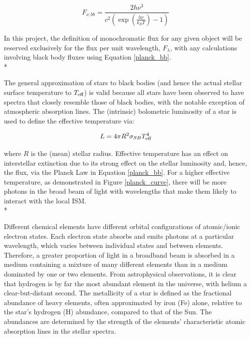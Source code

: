 \documentclass[12pt, a4paper]{report}
\begin{document}
\begin{equation}
F_{\nu,bb} = \frac{2h\nu^{3}}{c^{2}\left(\exp\left({\frac{h\nu}{k_{B}T}}\right) - 1\right)}
\label{planck_bb_freq}
\end{equation}

In this project, the definition of monochromatic flux for any given object will be reserved exclusively for the flux per unit wavelength, $F_{\lambda}$, with any calculations involving black body fluxes using Equation \ref{planck_bb}. \\*

The general approximation of stars to black bodies (and hence the actual stellar surface temperature to $T_{\textnormal{eff}}$) is valid because all stars have been observed to have spectra that closely resemble those of black bodies, with the notable exception of atmospheric absorption lines. The (intrinsic) bolometric luminosity of a star is used to define the effective temperature via:

\begin{equation}
L = 4 \pi R^{2} \sigma_{SB} T_{\textnormal{eff}}^{4}
\label{Teff_def}
\end{equation}

where $R$ is the (mean) stellar radius. Effective temperature has an effect on interstellar extinction due to its strong effect on the stellar luminosity and, hence, the flux, via the Planck Law in Equation \ref{planck_bb}. For a higher effective temperature, as demonstrated in Figure \ref{planck_curve}, there will be more photons in the broad beam of light with wavelengths that make them likely to interact with the local ISM. \\*

Different chemical elements have different orbital configurations of atomic/ionic electron states. Each electron state absorbs and emits photons at a particular wavelength, which varies between individual states and between elements. Therefore, a greater proportion of light in a broadband beam is absorbed in a medium containing a mixture of many different elements than in a medium dominated by one or two elements. From astrophysical observations, it is clear that hydrogen is by far the most abundant element in the universe, with helium a clear-but-distant second. The metallicity of a star is defined as the fractional abundance of heavy elements, often approximated by iron (Fe) alone, relative to the star's hydrogen (H) abundance, compared to that of the Sun. The abundances are determined by the strength of the elements' characteristic atomic absorption lines in the stellar spectra.
\end{document}
